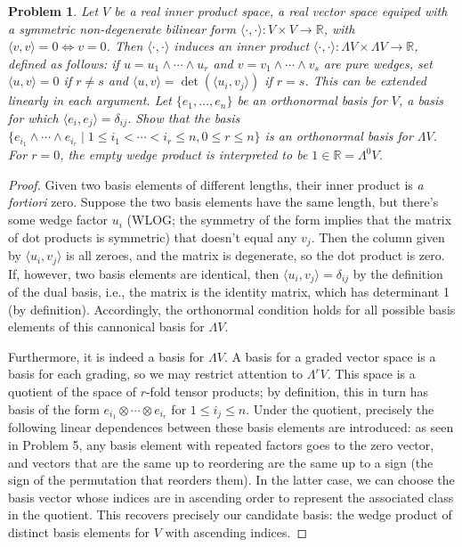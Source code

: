 \documentclass{article}
\newtheorem{plm}{Problem}
\begin{document}
\begin{plm}
  Let $V$ be a real inner product space, a real vector space equiped with a symmetric non-degenerate bilinear form
  $\langle \cdot, \cdot \rangle: V \times V \to \mathbb{R}$, with $\langle v, v \rangle = 0 \Leftrightarrow v = 0$.
  Then $\langle \cdot, \cdot \rangle$ induces an inner product $\langle \cdot, \cdot \rangle: \Lambda V \times \Lambda V \to \mathbb{R}$,
  defined as follows: if $u = u_{1} \land \cdots \land u_{r}$ and $v = v_{1} \land \cdots \land v_{s}$ are pure wedges,
  set $\langle u, v \rangle = 0$ if $r \neq s$ and $\langle u, v \rangle = \det(\langle u_{i}, v_{j} \rangle)$ if $r = s$.
  This can be extended linearly in each argument.
  Let $\{e_{1}, \ldots, e_{n}\}$ be an \textit{orthonormal} basis for $V$, a basis for which $\langle e_{i}, e_{j} \rangle = \delta_{ij}$.
  Show that the basis $\{e_{i_{1}} \land \cdots \land e_{i_{r}} \mid 1 \leq i_{1} < \cdots < i_{r} \leq n, 0 \leq r \leq n\}$
  is an orthonormal basis for $\Lambda V$.
  For $r = 0$, the empty wedge product is interpreted to be $1 \in \mathbb{R} = \Lambda^{0}V$.
\end{plm}

\begin{proof}
  Given two basis elements of different lengths, their inner product is \textit{a fortiori} zero.
  Suppose the two basis elements have the same length, but there's some wedge factor $u_{i}$ (WLOG; the symmetry of the form
  implies that the matrix of dot products is symmetric) that doesn't equal any $v_{j}$.
  Then the column given by $\langle u_{i}, v_{j} \rangle$ is all zeroes, and the matrix is degenerate, so the dot product is zero.
  If, however, two basis elements are identical, then $\langle u_i, v_j\rangle = \delta_{ij}$ by the definition of the dual basis,
  i.e., the matrix is the identity matrix, which has determinant 1 (by definition).
  Accordingly, the orthonormal condition holds for all possible basis elements of this cannonical basis for $\Lambda V$.

  Furthermore, it is indeed a basis for $\Lambda V$.
  A basis for a graded vector space is a basis for each grading, so we may restrict attention to $\Lambda^{r}V$.
  This space is a quotient of the space of $r$-fold tensor products; by definition, this in turn has basis of the form
  $e_{i_{1}} \otimes \cdots \otimes e_{i_{r}}$ for $1 \leq i_{j} \leq n$.
  Under the quotient, precisely the following linear dependences between these basis elements are introduced: as seen in Problem 5,
  any basis element with repeated factors goes to the zero vector, and vectors that are the same up to reordering are the same
  up to a sign (the sign of the permutation that reorders them).
  In the latter case, we can choose the basis vector whose indices are in ascending order to represent the associated class in the quotient.
  This recovers precisely our candidate basis: the wedge product of distinct basis elements for $V$ with ascending indices.
\end{proof}
\end{document}
